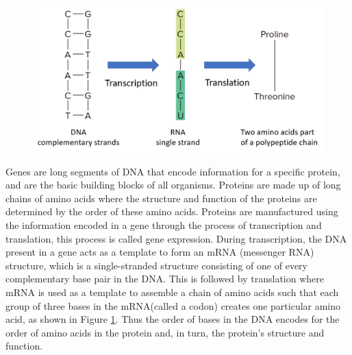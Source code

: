 \begin{figure}
  \centering
  \includegraphics[width=.75\linewidth]{images/ch_2_protein_generation.PNG}
  \label{fig:ch_2_protein_generation}
\end{figure}


Genes are long segments of DNA that encode information for a specific protein, and are the basic building blocks of all organisms. Proteins are made up of long chains of amino acids where the structure and function of the proteins are determined by the order of these amino acids. Proteins are manufactured using the information encoded in a gene through the process of transcription and translation, this process is called gene expression. During transcription, the DNA present in a gene acts as a template to form an mRNA (messenger RNA) structure, which is a single-stranded structure consisting of one of every complementary base pair in the DNA. This is followed by translation where mRNA is used as a template to assemble a chain of amino acids such that each group of three bases in the mRNA(called a codon) creates one particular amino acid, as shown in Figure \ref{fig:ch_2_protein_generation}. Thus the order of bases in the DNA encodes for the order of amino acids in the protein and, in turn, the protein's structure and function\cite{clancy2008translation}.

